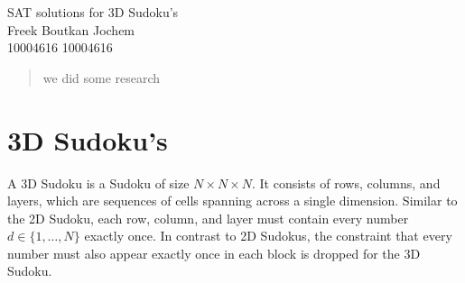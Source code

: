 \documentclass{article}
\begin{document}
\begin{center}
  \Large{SAT solutions for 3D Sudoku's}\\
  \vspace{.5cm}
  \small{Freek Boutkan \hspace{1.5cm} Jochem\\
  10004616 \hspace{1.5cm} 10004616}
\end{center}

\begin{abstract}
  we did some research
\end{abstract}

\section{3D Sudoku's}

A 3D Sudoku is a Sudoku of size $N \times N \times N$. It consists of rows, columns, and layers, which are sequences of cells spanning across a single dimension. Similar to the 2D Sudoku, each row, column, and layer must contain every number $d \in \{1, \hdots, N\}$ exactly once. In contrast to 2D Sudokus, the constraint that every number must also appear exactly once in each block is dropped for the 3D Sudoku. 
\end{document}
